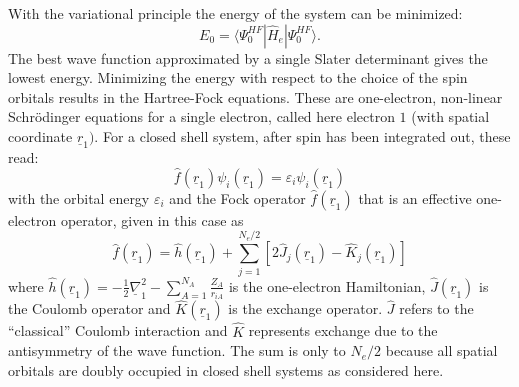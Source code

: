 \documentclass[11pt,DIV=13,BCOR=5mm,a4paper,headinclude]{scrbook}
\renewcommand{\vec}[1]{\underline{#1}}
\begin{document}
With the variational principle the energy of the system can be minimized:
\begin{equation}
E_0=\langle\Psi^{HF}_0|\hat{H}_e|\Psi^{HF}_0\rangle.
\end{equation}
The best wave function approximated by a single Slater determinant gives the lowest energy. %
Minimizing the energy with respect to the choice of the spin orbitals results in the Hartree-Fock equations.
These are one-electron, non-linear Schrödinger equations for a single electron, called here electron $1$ (with spatial coordinate $\vec{r}_1)$.
For a closed shell system, after spin has been integrated out, these read:
\begin{equation}\label{eq:hf}
\hat{f}(\vec{r}_1)\psi_i(\vec{r}_1)=\varepsilon_i\psi_i(\vec{r}_1)
\end{equation}
with the orbital energy $\varepsilon_i$ and the Fock operator $\hat{f}(\vec{r}_1)$ that is an effective one-electron operator, given in this case as
\begin{equation}
 \hat{f}(\vec{r}_1) = \hat{h}(\vec{r}_1) + \sum_{j=1}^{N_e/2}[2\hat{J}_j(\vec{r}_1) - \hat{K}_j(\vec{r}_1)]
\end{equation}
where $\hat{h}(\vec{r}_1)=-\frac{1}{2}\vec{\nabla}_1^2 - \sum_{A=1}^{N_A}\frac{Z_A}{r_{iA}}$ is the one-electron Hamiltonian, $\hat{J}(\vec{r}_1)$ is the Coulomb operator and $\hat{K}(\vec{r}_1)$ is the exchange operator.
$\hat{J}$ refers to the ``classical'' Coulomb interaction and $\hat{K}$ represents exchange due to the antisymmetry of the wave function.
The sum is only to $N_e/2$ because all spatial orbitals are doubly occupied in closed shell systems as considered here.
\end{document}
